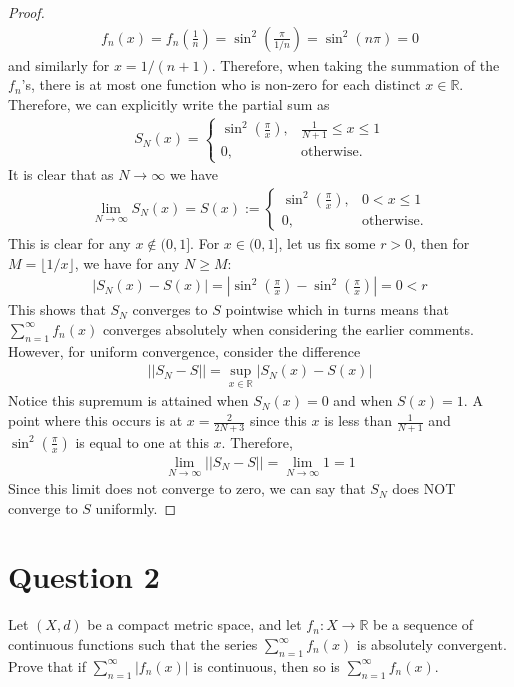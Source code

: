 \documentclass[10pt,a4paper]{article}
\theoremstyle{definition}
\theoremstyle{definition}
\numberwithin{equation}{section}
\begin{document}
\begin{proof}
\begin{align*}
f_n(x) = f_n\left(\frac{1}{n}\right) = \sin^2\left(\frac{\pi}{1/n}\right) = \sin^2(n\pi) = 0
\end{align*}
and similarly for $x = 1/(n+1)$. Therefore, when taking the summation of the $f_n$'s, there is at most one function who is non-zero for each distinct $x \in \mathbb{R}$. Therefore, we can explicitly write the partial sum as 
\begin{align*}
S_N(x) = \begin{cases}
\sin^2\left(\frac{\pi}{x}\right), & \frac{1}{N + 1} \leq x \leq 1\\
0, &\text{otherwise.}
\end{cases}
\end{align*}
It is clear that as $N \to \infty$ we have
\begin{align*}
\lim_{N \to \infty} S_N(x) = S(x) := \begin{cases}
\sin^2\left(\frac{\pi}{x}\right), &0 < x \leq 1\\
0, &\text{otherwise}.
\end{cases}
\end{align*}
This is clear for any $x \not \in (0, 1]$. For $x \in (0, 1]$, let us fix some $r > 0$, then for $M = \lfloor 1/x \rfloor$, we have for any $N \geq M$: 
\begin{align*}
|S_N(x) - S(x)| = \left|\sin^2\left(\frac{\pi}{x}\right) - \sin^2\left(\frac{\pi}{x}\right)\right| = 0 < r
\end{align*}
This shows that $S_N$ converges to $S$ pointwise which in turns means that $\sum_{n = 1}^\infty f_n(x)$ converges absolutely when considering the earlier comments. However, for uniform convergence, consider the difference
\begin{align*}
||S_N - S|| = \sup_{x \in \mathbb{R}} |S_N(x) - S(x)|
\end{align*}
Notice this supremum is attained when $S_N(x) = 0$ and when $S(x) = 1$. A point where this occurs is at $x = \frac{2}{2N + 3}$ since this $x$ is less than $\frac{1}{N + 1}$ and $\sin^2\left(\frac{\pi}{x}\right)$ is equal to one at this $x$. Therefore, 
\begin{align*}
\lim_{N \to \infty} ||S_N - S|| = \lim_{N \to \infty} 1 = 1
\end{align*}
Since this limit does not converge to zero, we can say that $S_N$ does NOT converge to $S$ uniformly. 
\end{proof}

\section*{Question 2}
Let $(X, d)$ be a compact metric space, and let $f_n: X \to \mathbb{R}$ be a sequence of continuous functions such that the series $\sum_{n = 1}^\infty f_n(x)$ is absolutely convergent. Prove that if $\sum_{n = 1}^\infty |f_n(x)|$ is continuous, then so is $\sum_{n = 1}^\infty f_n(x)$. 
\end{document}
